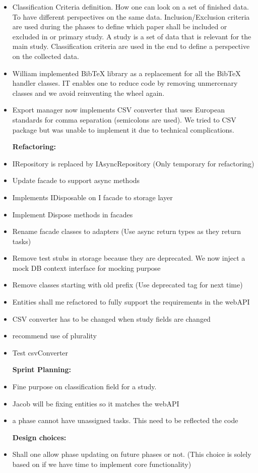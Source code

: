 \begin{itemize}
	\item Classification Criteria definition. How one can look on a set of finished data. To have different perspectives on the same data. Inclusion/Exclusion criteria are used during the phases to define which paper shall be included or excluded in or primary study. A study is a set of data that is relevant for the main study. Classification criteria are used in the end to define a perspective on the collected data.
	\item William implemented BibTeX library as a replacement for all the BibTeX handler classes. IT enables one to reduce code by removing unmercenary classes and we avoid reinventing the wheel again.
	\item Export manager now implements CSV converter that  uses European standards for comma separation (semicolons are used).  We tried to CSV package but was unable to implement it due to technical complications.
\end{itemize}

\begin{itemize}
	\item [\textbf{Refactoring:}]
	\item IRepository is replaced by IAsyncRepository (Only temporary for refactoring)
	\item Update facade to support async methods
	\item Implements IDisposable on I facade to storage layer
	\item Implement Dispose methods in facades
	\item Rename facade classes to adapters (Use async return types as they return tasks)
	\item Remove test stubs in storage because they are deprecated. We now inject a mock DB context interface for mocking purpose
	\item Remove classes starting with old prefix (Use deprecated tag for next time)
	\item Entities shall me refactored to fully support the requirements in the webAPI
	\item CSV converter has to be changed when study fields are changed
	\item recommend use of plurality
	\item Test csvConverter
\end{itemize}

\begin{itemize}
	\item [\textbf{Sprint Planning:}]
	\item Fine purpose on classification field for a study.
	\item Jacob will be fixing entities so it matches the webAPI
	\item a phase cannot have unassigned tasks. This need to be reflected the code     
\end{itemize}

\begin{itemize}
	\item [\textbf{Design choices:}]
	\item Shall one allow phase updating on future phases or not. (This choice is solely based on if we have time to implement core functionality)
\end{itemize}